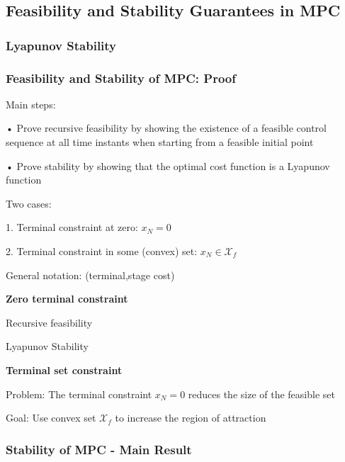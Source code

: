 
\subsection{Feasibility and Stability Guarantees in MPC}

\subsubsection{Lyapunov Stability}


\subsubsection{Feasibility and Stability of MPC: Proof}

Main steps:

• Prove recursive feasibility by showing the existence of a feasible control
sequence at all time instants when starting from a feasible initial point

• Prove stability by showing that the optimal cost function is a Lyapunov
function

Two cases:

1. Terminal constraint at zero: $x_N = 0$

2. Terminal constraint in some (convex) set: $x_N \in \mathcal{X}_f$

General notation:
(terminal,stage cost)

\textbf{Zero terminal constraint}

Recursive feasibility

Lyapunov Stability

\textbf{Terminal set constraint}

Problem: The terminal constraint $x_N = 0$ reduces
the size of the feasible set

Goal: Use convex set $\mathcal{X}_f$ to increase the region of attraction


\subsubsection{Stability of MPC - Main Result}

